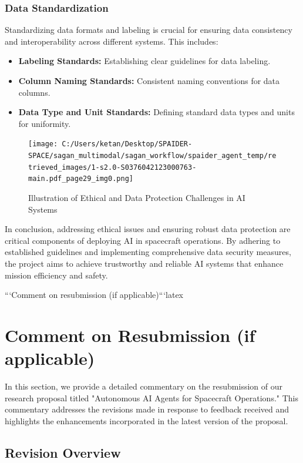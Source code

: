 \documentclass[a4paper, 11pt]{article}
\begin{document}
\subsubsection{Data Standardization}

Standardizing data formats and labeling is crucial for ensuring data consistency and interoperability across different systems. This includes:
\begin{itemize}
    \item \textbf{Labeling Standards:} Establishing clear guidelines for data labeling.
    \item \textbf{Column Naming Standards:} Consistent naming conventions for data columns.
    \item \textbf{Data Type and Unit Standards:} Defining standard data types and units for uniformity.
\end{itemize}

\begin{figure}[htbp]
    \centering
    \texttt{[image: C:/Users/ketan/Desktop/SPAIDER-SPACE/sagan\_multimodal/sagan\_workflow/spaider\_agent\_temp/retrieved\_images/1-s2.0-S0376042123000763-main.pdf\_page29\_img0.png]}
    \caption{Illustration of Ethical and Data Protection Challenges in AI Systems}
    \label{fig:ethical_data_protection}
\end{figure}

In conclusion, addressing ethical issues and ensuring robust data protection are critical components of deploying AI in spacecraft operations. By adhering to established guidelines and implementing comprehensive data security measures, the project aims to achieve trustworthy and reliable AI systems that enhance mission efficiency and safety.



```Comment on resubmission (if applicable)```latex
\section{Comment on Resubmission (if applicable)}

In this section, we provide a detailed commentary on the resubmission of our research proposal titled "Autonomous AI Agents for Spacecraft Operations." This commentary addresses the revisions made in response to feedback received and highlights the enhancements incorporated in the latest version of the proposal.

\subsection{Revision Overview}
\end{document}

